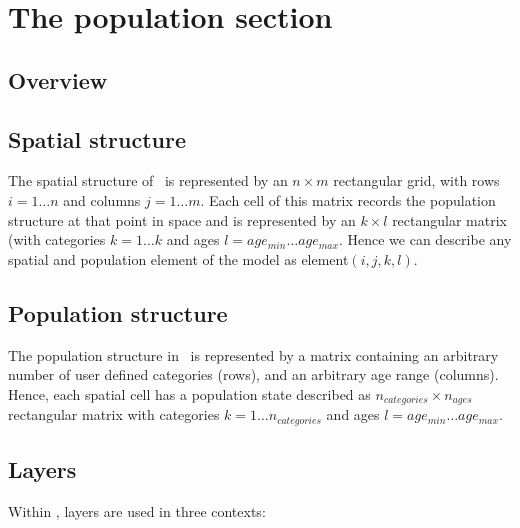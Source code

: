 \section{The population section\label{sec:population-section}}

\subsection{Overview}

\subsection{Spatial structure}

The spatial structure of \SPM\ is represented by an $n \times m$ rectangular grid, with rows $i=1 \dots n$ and columns $j=1 \ldots m$. Each cell of this matrix records the population structure at that point in space and is represented by an $k \times l$ rectangular matrix (with categories $k=1 \ldots k$ and ages $l=age_{min} \ldots age_{max}$. Hence we can describe any spatial and population element of the model as element$(i,j,k,l)$. 

\subsection{Population structure}

The population structure in \SPM\ is represented by a matrix containing an arbitrary number of user defined categories (rows), and an arbitrary age range (columns). Hence, each spatial cell has a population state described as $n_{categories} \times n_{ages}$ rectangular matrix with categories $k=1 \ldots n_{categories}$ and ages $l=age_{min} \ldots age_{max}$. 

\subsection{Layers}

Within \SPM, layers are used in three contexts:

